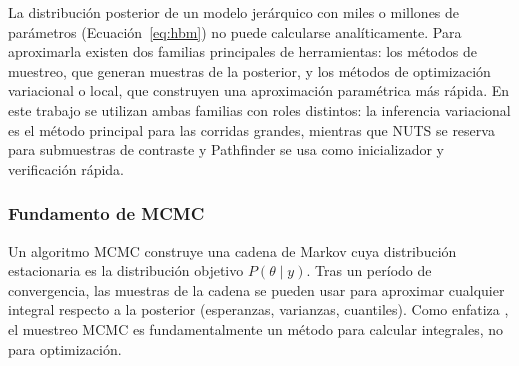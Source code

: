 \documentclass[stu, 12pt, letterpaper, donotrepeattitle, floatsintext, natbib]{apa7_ula}
\begin{document}
La distribución posterior de un modelo jerárquico con miles o millones
de parámetros (Ecuación~\ref{eq:hbm}) no puede calcularse
analíticamente. Para aproximarla existen dos familias principales de
herramientas: los métodos de muestreo, que generan muestras de la
posterior, y los métodos de optimización variacional o local, que
construyen una aproximación paramétrica más rápida. En este trabajo se
utilizan ambas familias con roles distintos: la inferencia variacional
es el método principal para las corridas grandes, mientras que NUTS se
reserva para submuestras de contraste y Pathfinder se usa como
inicializador y verificación rápida.

\subsubsection{Fundamento de MCMC}
Un algoritmo MCMC construye una cadena de Markov cuya distribución
estacionaria es la distribución objetivo $P(\theta \mid y)$. Tras
un período de convergencia, las muestras de la cadena se pueden
usar para aproximar cualquier integral respecto a la posterior
(esperanzas, varianzas, cuantiles). Como enfatiza \citet{Hogg_2018},
el muestreo MCMC es fundamentalmente un método para calcular
integrales, no para optimización.
\end{document}
